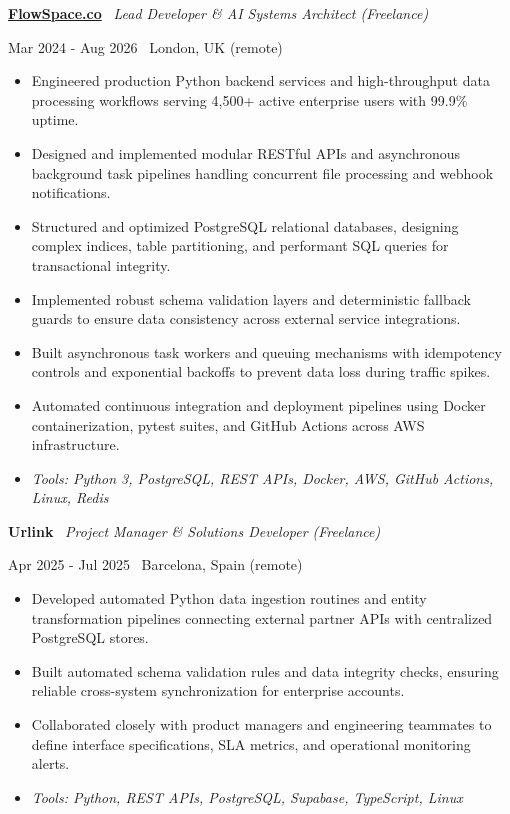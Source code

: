 \documentclass[a4paper,10pt]{article}
\newcommand{\role}[4]{%
 \vspace{2pt}\noindent
 \begin{minipage}[t]{0.70\textwidth}\raggedright\textbf{#1} \textbullet\ \textit{#3}\end{minipage}%
 \hfill
 \begin{minipage}[t]{0.28\textwidth}\raggedleft\footnotesize\color{gray}#2 \textbullet\ #4\end{minipage}%
 \vspace{1pt}%
}
\begin{document}
\role{\href{https://flowspace.co}{FlowSpace.co}}{Mar 2024 - Aug 2026}{Lead Developer \& AI Systems Architect (Freelance)}{London, UK (remote)}
\begin{itemize}
 \item Engineered production Python backend services and high-throughput data processing workflows serving 4,500+ active enterprise users with 99.9\% uptime.
 \item Designed and implemented modular RESTful APIs and asynchronous background task pipelines handling concurrent file processing and webhook notifications.
 \item Structured and optimized PostgreSQL relational databases, designing complex indices, table partitioning, and performant SQL queries for transactional integrity.
 \item Implemented robust schema validation layers and deterministic fallback guards to ensure data consistency across external service integrations.
 \item Built asynchronous task workers and queuing mechanisms with idempotency controls and exponential backoffs to prevent data loss during traffic spikes.
 \item Automated continuous integration and deployment pipelines using Docker containerization, pytest suites, and GitHub Actions across AWS infrastructure.
 \item \textit{Tools: Python 3, PostgreSQL, REST APIs, Docker, AWS, GitHub Actions, Linux, Redis}
\end{itemize}

\role{Urlink}{Apr 2025 - Jul 2025}{Project Manager \& Solutions Developer (Freelance)}{Barcelona, Spain (remote)}
\begin{itemize}
 \item Developed automated Python data ingestion routines and entity transformation pipelines connecting external partner APIs with centralized PostgreSQL stores.
 \item Built automated schema validation rules and data integrity checks, ensuring reliable cross-system synchronization for enterprise accounts.
 \item Collaborated closely with product managers and engineering teammates to define interface specifications, SLA metrics, and operational monitoring alerts.
 \item \textit{Tools: Python, REST APIs, PostgreSQL, Supabase, TypeScript, Linux}
\end{itemize}
\end{document}

